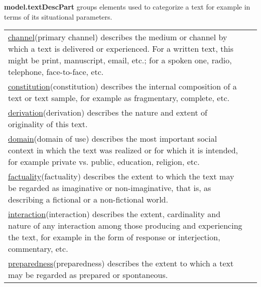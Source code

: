 \begin{sansreflist}
\item [\textbf{model.textDescPart}] groups elements used to categorize a text for example in terms of its situational parameters. \par 
\begin{longtable}{P{0.16776315789473684\textwidth}P{0.6822368421052631\textwidth}}
\hyperref[TEI.channel]{channel}\tabcellsep (primary channel) describes the medium or channel by which a text is delivered or experienced. For a written text, this might be print, manuscript, email, etc.; for a spoken one, radio, telephone, face-to-face, etc.\\
\hyperref[TEI.constitution]{constitution}\tabcellsep (constitution) describes the internal composition of a text or text sample, for example as fragmentary, complete, etc.\\
\hyperref[TEI.derivation]{derivation}\tabcellsep (derivation) describes the nature and extent of originality of this text.\\
\hyperref[TEI.domain]{domain}\tabcellsep (domain of use) describes the most important social context in which the text was realized or for which it is intended, for example private vs. public, education, religion, etc.\\
\hyperref[TEI.factuality]{factuality}\tabcellsep (factuality) describes the extent to which the text may be regarded as imaginative or non-imaginative, that is, as describing a fictional or a non-fictional world.\\
\hyperref[TEI.interaction]{interaction}\tabcellsep (interaction) describes the extent, cardinality and nature of any interaction among those producing and experiencing the text, for example in the form of response or interjection, commentary, etc.\\
\hyperref[TEI.preparedness]{preparedness}\tabcellsep (preparedness) describes the extent to which a text may be regarded as prepared or spontaneous.\end{longtable} \par
 
\end{sansreflist}

